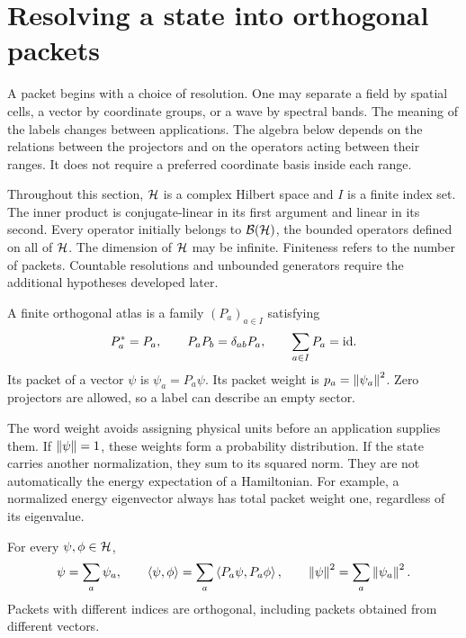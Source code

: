 \section{Resolving a state into orthogonal packets}\label{f:resolution}

A packet begins with a choice of resolution. One may separate a field by spatial cells, a vector by coordinate groups, or a wave by spectral bands. The meaning of the labels changes between applications. The algebra below depends on the relations between the projectors and on the operators acting between their ranges. It does not require a preferred coordinate basis inside each range.

Throughout this section, $\mathcal H$ is a complex Hilbert space and $I$ is a finite index set. The inner product is conjugate-linear in its first argument and linear in its second. Every operator initially belongs to $\mathcal B(\mathcal H)$, the bounded operators defined on all of $\mathcal H$. The dimension of $\mathcal H$ may be infinite. Finiteness refers to the number of packets. Countable resolutions and unbounded generators require the additional hypotheses developed later.

\begin{definition}
A finite orthogonal atlas is a family $(P_a)_{a\in I}$ satisfying
\begin{equation}\label{f:atlas-relations}
 P_a^*=P_a,\qquad P_aP_b=\delta_{ab}P_a,
 \qquad \sum_{a\in I}P_a=\mathrm{id}.
\end{equation}
Its packet of a vector $\psi$ is $\psi_a=P_a\psi$. Its packet weight is $p_a=\left\lVert\psi_a\right\rVert^2$. Zero projectors are allowed, so a label can describe an empty sector.
\end{definition}

The word weight avoids assigning physical units before an application supplies them. If $\left\lVert\psi\right\rVert=1$, these weights form a probability distribution. If the state carries another normalization, they sum to its squared norm. They are not automatically the energy expectation of a Hamiltonian. For example, a normalized energy eigenvector always has total packet weight one, regardless of its eigenvalue.

\begin{proposition}\label{f:parseval}
For every $\psi,\phi\in\mathcal H$,
\begin{equation}\label{f:reconstruct}
 \psi=\sum_a\psi_a,\qquad
 \left\langle\psi,\phi\right\rangle=\sum_a\left\langle P_a\psi,P_a\phi\right\rangle,\qquad
 \left\lVert\psi\right\rVert^2=\sum_a\left\lVert\psi_a\right\rVert^2.
\end{equation}
Packets with different indices are orthogonal, including packets obtained from different vectors.
\end{proposition}

